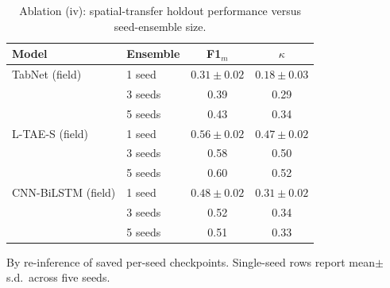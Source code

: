\documentclass[preprint,authoryear,3p]{elsarticle}
\begin{document}
\begin{table}[!t]
\centering
\scriptsize
\caption{Ablation (iv): spatial-transfer holdout performance versus seed-ensemble size.}
\label{stab:ens}
\renewcommand{\arraystretch}{1.12}
\setlength{\tabcolsep}{8pt}
\begin{tabular}{llcc}
\toprule
\textbf{Model} & \textbf{Ensemble} & \textbf{F1$_m$} & \textbf{$\kappa$} \\
\midrule
TabNet (field)     & 1 seed  & $0.31\pm0.02$ & $0.18\pm0.03$ \\
                   & 3 seeds & 0.39 & 0.29 \\
                   & 5 seeds & 0.43 & 0.34 \\
\midrule
L-TAE-S (field)    & 1 seed  & $0.56\pm0.02$ & $0.47\pm0.02$ \\
                   & 3 seeds & 0.58 & 0.50 \\
                   & 5 seeds & 0.60 & 0.52 \\
\midrule
CNN-BiLSTM (field) & 1 seed  & $0.48\pm0.02$ & $0.31\pm0.02$ \\
                   & 3 seeds & 0.52 & 0.34 \\
                   & 5 seeds & 0.51 & 0.33 \\
\bottomrule
\end{tabular}
\par\vspace{3pt}
\begin{minipage}{\linewidth}
\footnotesize
By re-inference of saved per-seed checkpoints. Single-seed rows report mean$\pm$s.d.\ across five seeds.
\end{minipage}
\end{table}
\end{document}
